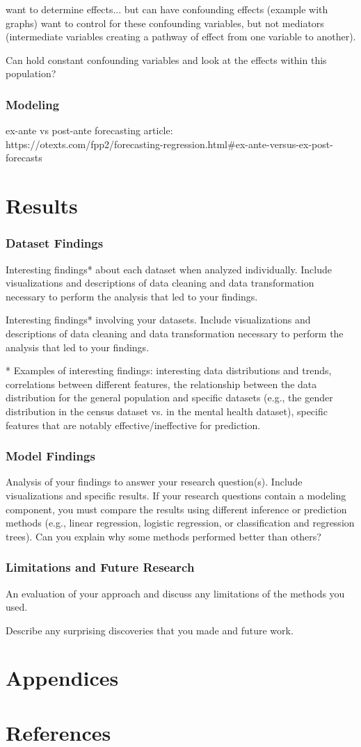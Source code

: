 \documentclass[11pt]{article}
\begin{document}
want to determine effects... 
but can have confounding effects (example with graphs) 
want to control for these confounding variables, but not mediators (intermediate variables creating a pathway of effect from one variable to another). 

Can hold constant confounding variables and look at the effects within this population? 


\subsubsection{Modeling}

ex-ante vs post-ante forecasting article:\\
https://otexts.com/fpp2/forecasting-regression.html\#ex-ante-versus-ex-post-forecasts


\section{Results}

\subsubsection{Dataset Findings}
 Interesting findings* about each dataset when analyzed individually. Include visualizations and descriptions of data cleaning and data transformation necessary to perform the analysis that led to your findings.
 
 Interesting findings* involving your datasets. Include visualizations and descriptions of data cleaning and data transformation necessary to perform the analysis that led to your findings. 
 
 
* Examples of interesting findings: interesting data distributions and trends, correlations between different features, the relationship between the data distribution for the general population and specific datasets (e.g., the gender distribution in the census dataset vs. in the mental health dataset), specific features that are notably effective/ineffective for prediction.
 
\subsubsection{Model Findings}
Analysis of your findings to answer your research question(s). Include visualizations and specific results. If your research questions contain a modeling component, you must compare the results using different inference or prediction methods (e.g., linear regression, logistic regression, or classification and regression trees). Can you explain why some methods performed better than others?


\subsubsection{Limitations and Future Research}
 An evaluation of your approach and discuss any limitations of the methods you used.

Describe any surprising discoveries that you made and future work.


\section{Appendices}
\section{References}


\end{document}
